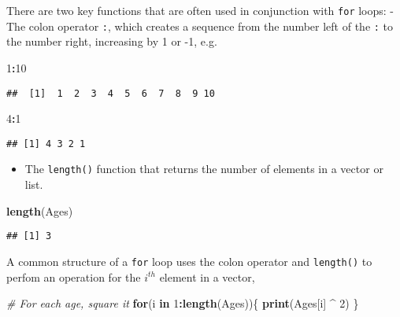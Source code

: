 \documentclass[
]{article}
\newenvironment{Shaded}{\begin{snugshade}}{\end{snugshade}}
\newcommand{\CommentTok}[1]{\textcolor[rgb]{0.56,0.35,0.01}{\textit{#1}}}
\newcommand{\ControlFlowTok}[1]{\textcolor[rgb]{0.13,0.29,0.53}{\textbf{#1}}}
\newcommand{\DecValTok}[1]{\textcolor[rgb]{0.00,0.00,0.81}{#1}}
\newcommand{\KeywordTok}[1]{\textcolor[rgb]{0.13,0.29,0.53}{\textbf{#1}}}
\newcommand{\NormalTok}[1]{#1}
\newcommand{\OperatorTok}[1]{\textcolor[rgb]{0.81,0.36,0.00}{\textbf{#1}}}
\newcommand{\StringTok}[1]{\textcolor[rgb]{0.31,0.60,0.02}{#1}}
\providecommand{\tightlist}{%
  \setlength{\itemsep}{0pt}\setlength{\parskip}{0pt}}
\begin{document}
There are two key functions that are often used in conjunction with
\texttt{for} loops: - The colon operator \texttt{:}, which creates a
sequence from the number left of the \texttt{:} to the number right,
increasing by 1 or -1, e.g.

\begin{Shaded}
\begin{Highlighting}[]
\DecValTok{1}\OperatorTok{:}\DecValTok{10}
\end{Highlighting}
\end{Shaded}

\begin{verbatim}
##  [1]  1  2  3  4  5  6  7  8  9 10
\end{verbatim}

\begin{Shaded}
\begin{Highlighting}[]
\DecValTok{4}\OperatorTok{:}\DecValTok{1} 
\end{Highlighting}
\end{Shaded}

\begin{verbatim}
## [1] 4 3 2 1
\end{verbatim}

\begin{itemize}
\tightlist
\item
  The \texttt{length()} function that returns the number of elements in
  a vector or list.
\end{itemize}

\begin{Shaded}
\begin{Highlighting}[]
\KeywordTok{length}\NormalTok{(Ages)}
\end{Highlighting}
\end{Shaded}

\begin{verbatim}
## [1] 3
\end{verbatim}

A common structure of a \texttt{for} loop uses the colon operator and
\texttt{length()} to perfom an operation for the \(i^{th}\) element in a
vector,

\begin{Shaded}
\begin{Highlighting}[]
\CommentTok{# For each age, square it}
\ControlFlowTok{for}\NormalTok{(i }\ControlFlowTok{in} \DecValTok{1}\OperatorTok{:}\KeywordTok{length}\NormalTok{(Ages))\{}
  \KeywordTok{print}\NormalTok{(Ages[i] }\OperatorTok{^}\StringTok{ }\DecValTok{2}\NormalTok{)}
\NormalTok{\}}
\end{Highlighting}
\end{Shaded}
\end{document}
